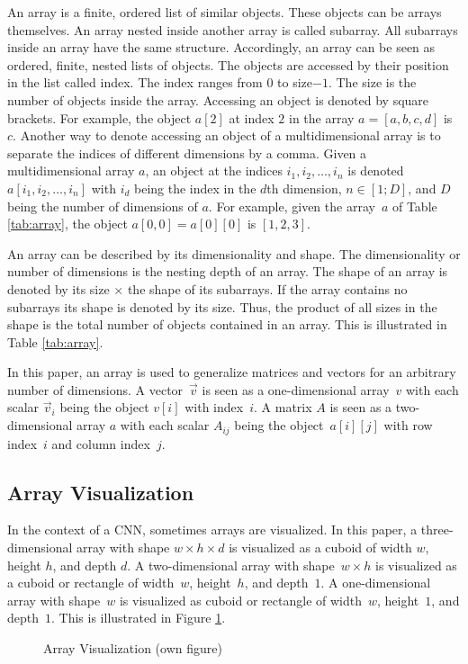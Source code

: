 An array is a finite, ordered list of similar objects. These objects can be arrays themselves. An array nested inside another array is called subarray. All subarrays inside an array have the same structure. Accordingly, an array can be seen as ordered, finite, nested lists of objects. The objects are accessed by their position in the list called index. The index ranges from $0$ to size$-1$. The size is the number of objects inside the array. Accessing an object is denoted by square brackets. For example, the object $a[2]$ at index $2$ in the array $a = [a,b,c,d]$ is $c$.\autocites{Black.2016}{Garcia.2005}
Another way to denote accessing an object of a multidimensional array is to separate the indices of different dimensions by a comma. Given a multidimensional array $a$, an object at the indices $i_1, i_2, \dots, i_n$ is denoted $a[i_1, i_2, \dots, i_n]$
with $i_d$ being the index in the $d$th dimension, $n \in [1;D]$, and $D$ being the number of dimensions of $a$. For example, given the array~$a$ of Table \ref{tab:array}, the object $a[0,0] = a[0][0]$ is $[1,2,3]$. \autocite{Castro.2010}
\par
An array can be described by its dimensionality and shape.
The dimensionality or number of dimensions is the nesting depth of an array.
The shape of an array is denoted by its size $\times$ the shape of its subarrays. If the array contains no subarrays its shape is denoted by its size. Thus, the product of all sizes in the shape is the total number of objects contained in an array.\autocites{Black.2016}{Garcia.2005} This is illustrated in Table \ref{tab:array}.

\par
In this paper, an array is used to generalize matrices and vectors for an arbitrary number of dimensions. 
A vector~$\vec{v}$ is seen as a one-dimensional array~$v$ with each scalar $\vec{v}_i$ being the object $v[i]$ with index~$i$.
A matrix $A$ is seen as a two-dimensional array $a$ with each scalar $A_{ij}$ being the object~$a[i][j]$ with row index~$i$ and column index~$j$.
\subsection{Array Visualization}
In the context of a \ac{CNN}, sometimes arrays are visualized. \autocites{Singh.2020}{ElAmir.2020}
In this paper, a three-dimensional array with shape $w \times h \times d$ is visualized as a cuboid of width $w$, height $h$, and depth $d$.
A two-dimensional array with shape~$w \times h$ is visualized as a cuboid or rectangle of width~$w$, height~$h$, and depth~$1$.
A one-dimensional array with shape~$w$ is visualized as cuboid or rectangle of width~$w$, height~$1$, and depth~$1$. \autocites{Ertel.2016}{Rawat.2017}{Sabour.2017}{Krizhevsky.2012}{LeCun.2015b}
This is illustrated in Figure \ref{fig:array}.
\begin{figure}[H]
	
	\caption{Array Visualization (own figure)}
	\label{fig:array}
\end{figure}
